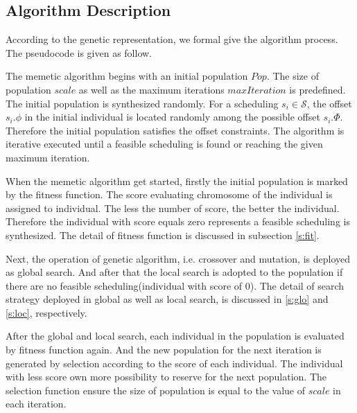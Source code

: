 \documentclass[journal]{IEEEtran}
\newcommand{\calS}{\mathcal{S}}
\begin{document}
\subsection{Algorithm Description}

According to the genetic representation, we formal give the algorithm process. The pseudocode is given as follow.

The memetic algorithm begins with an initial population $Pop$. The size of population $scale$ as well as the maximum iterations $maxIteration$ is predefined.
The initial population is synthesized randomly.
For a scheduling $s_{i}\in\calS$,
 the offset $s_i.\phi$ in the initial individual is located randomly among the possible offset $s_i.\Phi$.
Therefore the initial population satisfies the offset constraints.
The algorithm is iterative executed until a feasible scheduling is found or reaching the given maximum iteration.

When the memetic algorithm get started, firstly the initial population is marked by the fitness function.
The score evaluating chromosome of the individual is assigned to individual.
The less the number of score, the better the individual.
Therefore the individual with score equals zero represents a feasible scheduling is synthesized.
The detail of fitness function is discussed in subsection \ref{s:fit}.

Next, the operation of genetic algorithm,
 i.e. crossover and mutation,
  is deployed as global search.
And after that the local search is adopted to the population if there are no feasible scheduling(individual with score of 0).
The detail of search strategy deployed in global as well as local search, is discussed in \ref{s:glo} and \ref{s:loc}, respectively.

After the global and local search,
 each individual in the population is evaluated by fitness function again.
And the new population for the next iteration is generated by selection according to the score of each individual.
The individual with less score own more possibility to reserve for the next population.
The selection function ensure the size of population is equal to the value of $scale$ in each iteration.
\end{document}
